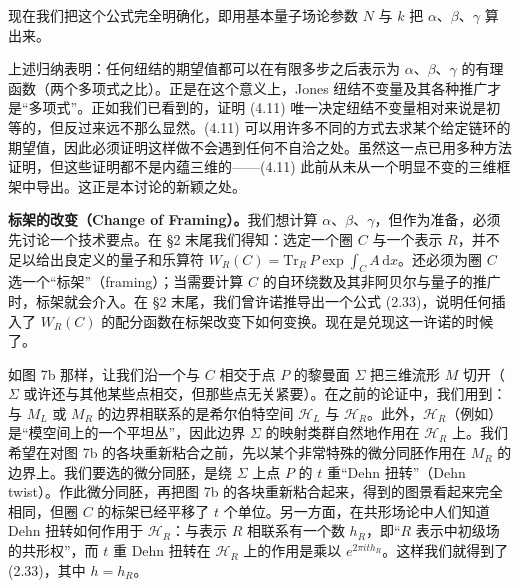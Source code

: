 \documentclass[11pt,a4paper]{article}
\begin{document}

现在我们把这个公式完全明确化，即用基本量子场论参数 $N$ 与 $k$ 把 $\alpha$、$\beta$、$\gamma$ 算出来。

上述归纳表明：任何纽结的期望值都可以在有限多步之后表示为 $\alpha$、$\beta$、$\gamma$ 的有理函数（两个多项式之比）。正是在这个意义上，Jones 纽结不变量及其各种推广才是“多项式”。正如我们已看到的，证明 (4.11) 唯一决定纽结不变量相对来说是初等的，但反过来远不那么显然。(4.11) 可以用许多不同的方式去求某个给定链环的期望值，因此必须证明这样做不会遇到任何不自洽之处。虽然这一点已用多种方法证明，但这些证明都不是内蕴三维的——(4.11) 此前从未从一个明显不变的三维框架中导出。这正是本讨论的新颖之处。

\textbf{标架的改变（Change of Framing）。}我们想计算 $\alpha$、$\beta$、$\gamma$，但作为准备，必须先讨论一个技术要点。在 §2 末尾我们得知：选定一个圈 $C$ 与一个表示 $R$，并不足以给出良定义的量子和乐算符 $W_R(C)=\mathrm{Tr}_R\,P\exp\int_C A\,\mathrm{d}x$。还必须为圈 $C$ 选一个“标架”（framing）；当需要计算 $C$ 的自环绕数及其非阿贝尔与量子的推广时，标架就会介入。在 §2 末尾，我们曾许诺推导出一个公式 (2.33)，说明任何插入了 $W_R(C)$ 的配分函数在标架改变下如何变换。现在是兑现这一许诺的时候了。


如图 7b 那样，让我们沿一个与 $C$ 相交于点 $P$ 的黎曼面 $\Sigma$ 把三维流形 $M$ 切开（$\Sigma$ 或许还与其他某些点相交，但那些点无关紧要）。在之前的论证中，我们用到：与 $M_L$ 或 $M_R$ 的边界相联系的是希尔伯特空间 $\mathcal{H}_L$ 与 $\mathcal{H}_R$。此外，$\mathcal{H}_R$（例如）是“模空间上的一个平坦丛”，因此边界 $\Sigma$ 的映射类群自然地作用在 $\mathcal{H}_R$ 上。我们希望在对图 7b 的各块重新粘合之前，先以某个非常特殊的微分同胚作用在 $M_R$ 的边界上。我们要选的微分同胚，是绕 $\Sigma$ 上点 $P$ 的 $t$ 重“Dehn 扭转”（Dehn twist）。作此微分同胚，再把图 7b 的各块重新粘合起来，得到的图景看起来完全相同，但圈 $C$ 的标架已经平移了 $t$ 个单位。另一方面，在共形场论中人们知道 Dehn 扭转如何作用于 $\mathcal{H}_R$：与表示 $R$ 相联系有一个数 $h_R$，即“$R$ 表示中初级场的共形权”，而 $t$ 重 Dehn 扭转在 $\mathcal{H}_R$ 上的作用是乘以 $e^{2\pi i t h_R}$。这样我们就得到了 (2.33)，其中 $h=h_R$。
\end{document}
